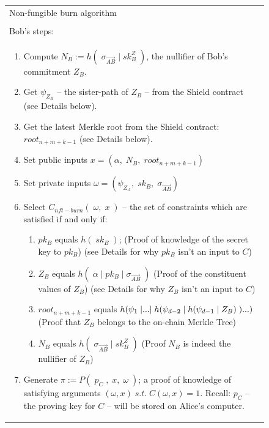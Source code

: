 \documentclass{article}
\newcounter{ongoingEnumCounter}%
\DeclarePairedDelimiter\br{(}{)}
\begin{document}
\newpage
\begin{figure}[H]
  \ContinuedFloat*
	\begin{center}
		\begin{framed}
      \begin{tabular}{p{16cm}}
        Non-fungible burn algorithm \\
        \\
        \hline
        Bob's steps:\\
        \begin{enumerate}
          \setcounter{enumi}{\value{ongoingEnumCounter}}
          \item Compute $N_B := h(\;\sigma_{\vec{AB}}\;|\;sk^Z_B\;)$, the nullifier of Bob's commitment $Z_B$.
          \item Get $\psi_{Z_B}$ -- the sister-path of $Z_B$ -- from the Shield contract (see Details below).
          \item Get the latest Merkle root from the Shield contract: $root_{n+m+k-1}$ (see Details below).
          \item Set public inputs $x = (\alpha,\;N_B,\;root_{n+m+k-1})$
          \item Set private inputs $\omega = (\psi_{Z_A},\;sk_B,\;\sigma_{\vec{AB}})$
          \item Select $C_{nft-burn}(\;\omega,\;x\;)$ -- the set of constraints which are satisfied if and only if:
          \begin{enumerate}
            \item $pk_B$ equals $h(\;sk_B\;)$; (Proof of knowledge of the secret key to $pk_B$) (see Details for why $pk_B$ isn't an input to $C$)
            \item $Z_B$ equals $h(\;\alpha\;|\;pk_B\;|\;\sigma_{\vec{AB}}\;)$ (Proof of the constituent values of $Z_B$) (see Details for why $Z_B$ isn't an input to $C$)
            \item $root_{n+m+k-1}$ equals $h\br*{\psi_{1}\;|...|\;h\br*{\psi_{d-2}\;|\;h\br*{\psi_{d-1}\;|\;Z_B}\;}...}$ (Proof that $Z_B$ belongs to the on-chain Merkle Tree)
            \item $N_B$ equals $h(\;\sigma_{\vec{AB}}\;|\;sk^Z_B\;)$ (Proof $N_B$ is indeed the nullifier of $Z_B$)
          \end{enumerate}
          \item Generate $\pi := P(\;p_C\;,\;x,\;\omega\;)$; a proof of knowledge of satisfying arguments $(\omega, x)\;s.t.\;C(\omega, x) = 1$. Recall: $p_C$ -- the proving key for $C$ -- will be stored on Alice's computer.


\end{enumerate}
\end{tabular}
\end{framed}
\end{center}
\end{figure}
\end{document}
